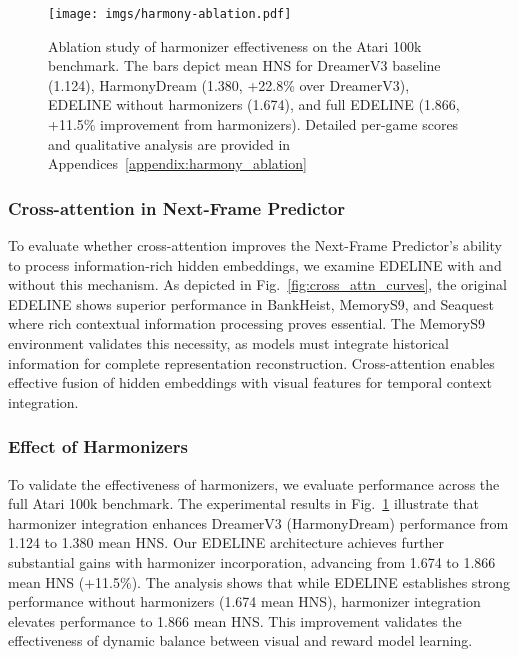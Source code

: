 \begin{figure}[ht]
    \centering
    \texttt{[image: imgs/harmony-ablation.pdf]}
    \caption{Ablation study of harmonizer effectiveness on the Atari 100k benchmark. The bars depict mean HNS for DreamerV3 baseline (1.124), HarmonyDream (1.380, +22.8\% over DreamerV3), EDELINE without harmonizers (1.674), and full EDELINE (1.866, +11.5\% improvement from harmonizers). Detailed per-game scores and qualitative analysis are provided in Appendices~\ref{appendix:harmony_ablation}}
    \label{fig:harmony_ablation}
    \vspace{-0.5em}
\end{figure}

\subsubsection{Cross-attention in Next-Frame Predictor}
\label{subsec:cross_attn_ablation}
To evaluate whether cross-attention improves the Next-Frame Predictor's ability to process information-rich hidden embeddings, we examine EDELINE with and without this mechanism. As depicted in Fig.~\ref{fig:cross_attn_curves}, the original EDELINE shows superior performance in BankHeist, MemoryS9, and Seaquest where rich contextual information processing proves essential. The MemoryS9 environment validates this necessity, as models must integrate historical information for complete representation reconstruction. Cross-attention enables effective fusion of hidden embeddings with visual features for temporal context integration.

\subsubsection{Effect of Harmonizers}

To validate the effectiveness of harmonizers, we evaluate performance across the full Atari 100k benchmark. The experimental results in Fig.~\ref{fig:harmony_ablation} illustrate that harmonizer integration enhances DreamerV3 (HarmonyDream) performance from 1.124 to 1.380 mean HNS. Our EDELINE architecture achieves further substantial gains with harmonizer incorporation, advancing from 1.674 to 1.866 mean HNS (+11.5\%). The analysis shows that while EDELINE establishes strong performance without harmonizers (1.674 mean HNS), harmonizer integration elevates performance to 1.866 mean HNS. This improvement validates the effectiveness of dynamic balance between visual and reward model learning.
